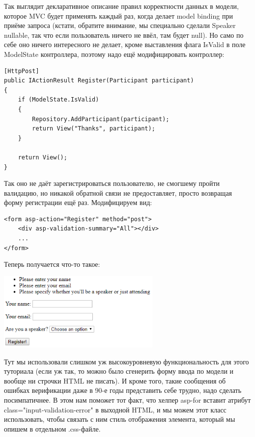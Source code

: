 \documentclass[a5paper]{article}
\begin{document}
Так выглядит декларативное описание правил корректности данных в модели, которое MVC будет применять каждый раз, когда делает model binding при приёме запроса (кстати, обратите внимание, мы специально сделали Speaker nullable, так что если пользователь ничего не ввёл, там будет null). 
Но само по себе оно ничего интересного не делает, кроме выставления флага IsValid в поле ModelState контроллера, поэтому надо ещё модифицировать контроллер:

\begin{verbatim}
[HttpPost]
public IActionResult Register(Participant participant)
{
    if (ModelState.IsValid)
    {
        Repository.AddParticipant(participant);
        return View("Thanks", participant);
    }

    return View();
}
\end{verbatim}

Так оно не даёт зарегистрироваться пользователю, не смогшему пройти валидацию, но никакой обратной связи не предоставляет, просто возвращая форму регистрации ещё раз. Модифицируем вид:

\begin{verbatim}
<form asp-action="Register" method="post">
    <div asp-validation-summary="All"></div>
    ...
</form>
\end{verbatim}

Теперь получается что-то такое:

\begin{center}
    \includegraphics[width=0.6\textwidth]{validationError.png}
\end{center}

Тут мы использовали слишком уж высокоуровневую функциональность для этого туториала (если уж так, то можно было сгенерить форму ввода по модели и вообще ни строчки HTML не писать). И кроме того, такие сообщения об ошибках верификации даже в 90-е годы представить себе трудно, надо 
сделать посимпатичнее. В этом нам поможет тот факт, что хелпер asp-for вставит атрибут class="input-validation-error" в выходной HTML, и мы можем этот класс использовать, чтобы связать с ним стиль отображения элемента, который мы опишем в отдельном .css-файле.
\end{document}
